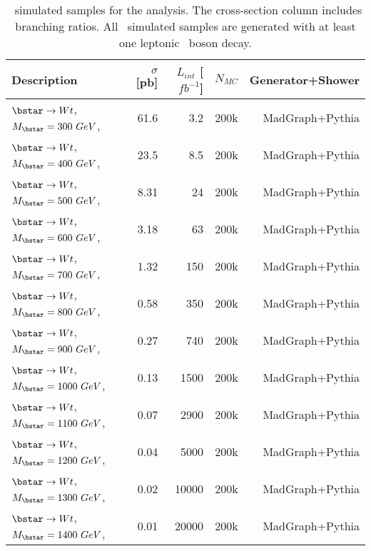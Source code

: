 \begin{table}[htdp]
\begin{center}
\begin{tabular}{lrrrr}
\hline
Description         & $\sigma$ [pb]  & $L_{int}$ [$fb^{-1}$] &  $N_{MC}$& Generator+Shower \\[1mm]
\hline \hline
$\bstar\to Wt$, $M_{\bstar}=300 \ GeV$, & 61.6 & 3.2 & 200k &MadGraph+Pythia \\[1mm]
$\bstar\to Wt$, $M_{\bstar}=400 \ GeV$, & 23.5 & 8.5 & 200k &MadGraph+Pythia \\[1mm]
$\bstar\to Wt$, $M_{\bstar}=500 \ GeV$, & 8.31 & 24 & 200k &MadGraph+Pythia \\[1mm]
$\bstar\to Wt$, $M_{\bstar}=600 \ GeV$, & 3.18 & 63 & 200k &MadGraph+Pythia \\[1mm]
$\bstar\to Wt$, $M_{\bstar}=700 \ GeV$, & 1.32 & 150 & 200k &MadGraph+Pythia \\[1mm]
$\bstar\to Wt$, $M_{\bstar}=800 \ GeV$, & 0.58 & 350 & 200k &MadGraph+Pythia \\[1mm]
$\bstar\to Wt$, $M_{\bstar}=900 \ GeV$, & 0.27 & 740 & 200k &MadGraph+Pythia \\[1mm]
$\bstar\to Wt$, $M_{\bstar}=1000\ GeV$, & 0.13 & 1500 & 200k &MadGraph+Pythia \\[1mm]
$\bstar\to Wt$, $M_{\bstar}=1100\ GeV$, & 0.07 & 2900 & 200k &MadGraph+Pythia \\[1mm]
$\bstar\to Wt$, $M_{\bstar}=1200\ GeV$, & 0.04 & 5000 & 200k &MadGraph+Pythia \\[1mm]
$\bstar\to Wt$, $M_{\bstar}=1300\ GeV$, & 0.02 & 10000 & 200k &MadGraph+Pythia \\[1mm]
$\bstar\to Wt$, $M_{\bstar}=1400\ GeV$, & 0.01 & 20000 & 200k &MadGraph+Pythia \\[1mm]
\hline
\hline\hline
\end{tabular}
\caption{\bstar\ simulated samples for the analysis. The cross-section column includes branching ratios. All \bstar\ simulated samples are generated with at least one leptonic \Wboson\ boson decay.
}
\label{TABLE-MCSAMPSIG1}
\end{center}
\end{table}


